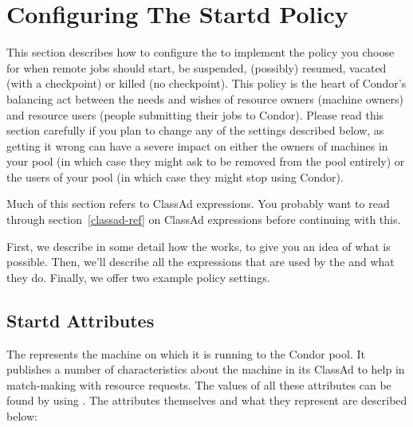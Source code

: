 \section{Configuring The Startd Policy}
\label{sec:Configuring-Policy}

This section describes how to configure the  to
implement the policy you choose for when remote jobs should start, be
suspended, (possibly) resumed, vacated (with a checkpoint) or killed
(no checkpoint).  This policy is the heart of Condor's balancing act
between the needs and wishes of resource owners (machine owners) and
resource users (people submitting their jobs to Condor).  Please read
this section carefully if you plan to change any of the settings
described below, as getting it wrong can have a severe impact on
either the owners of machines in your pool (in which case they might
ask to be removed from the pool entirely) or the users of your pool
(in which case they might stop using Condor).  

Much of this section refers to ClassAd expressions.  You probably want
to read through section~\ref{classad-ref} on ClassAd expressions before 
continuing with this. 

First, we describe in some detail how the  works, to
give you an idea of what is possible.  Then, we'll describe all the
expressions that are used by the  and what they do.
Finally, we offer two example policy settings.

\subsection{Startd Attributes}
\label{sec:Startd-Attributes}

The  represents the machine on which it is running to
the Condor pool.  It publishes a number of characteristics about the
machine in its ClassAd to help in match-making with resource requests.
The values of all these attributes can be found by using
.  The attributes themselves and
what they represent are described below:



